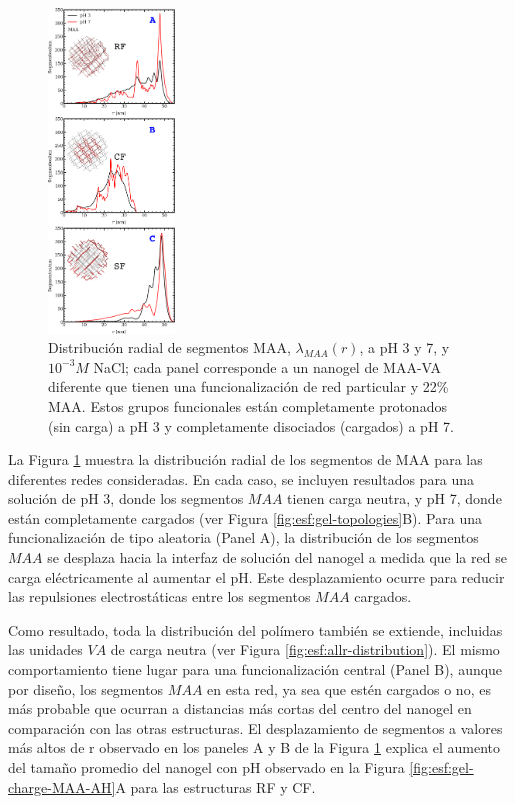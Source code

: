 \begin{figure}[!htb]
     \centering
     \includegraphics[width=0.30\textwidth]{Figures/graphs-gel2/dist-MAA.pdf}
     \caption{Distribuci\'on radial de segmentos MAA, $\lambda_{MAA}(r)$, a pH 3 y 7, y $10^{-3}M$ NaCl; cada panel corresponde a un nanogel de  MAA-VA diferente que tienen una funcionalizaci\'on de red particular y 22\% MAA.
     	Estos grupos funcionales est\'an completamente protonados (sin carga) a pH 3 y completamente disociados (cargados) a pH 7.}
     \label{fig:esf:MAA-vs-r-distribution}
 \end{figure}

La Figura \ref{fig:esf:MAA-vs-r-distribution} muestra la distribuci\'on radial de los segmentos de MAA para las diferentes redes consideradas. En cada caso, se incluyen resultados para una soluci\'on de pH 3, donde los segmentos $MAA$ tienen carga neutra, y pH 7, donde est\'an completamente cargados (ver Figura \ref{fig:esf:gel-topologies}B). Para una funcionalizaci\'on de tipo aleatoria (Panel A), la distribuci\'on de los segmentos $MAA$ se desplaza hacia la interfaz de soluci\'on del nanogel a medida que la red se carga el\'ectricamente al aumentar el pH. Este desplazamiento ocurre para reducir las repulsiones electrost\'aticas entre los segmentos $MAA$ cargados.

Como resultado, toda la distribuci\'on del pol\'imero tambi\'en se extiende, incluidas las unidades $VA$ de carga neutra (ver Figura \ref{fig:esf:allr-distribution}). El mismo comportamiento tiene lugar para una funcionalizaci\'on central (Panel B), aunque por dise\~no, los segmentos $MAA$ en esta red, ya sea que est\'en cargados o no, es m\'as probable que ocurran a distancias m\'as cortas del centro del nanogel en comparaci\'on con las otras estructuras. El desplazamiento de segmentos a valores m\'as altos de r observado en los paneles A y B de la Figura \ref{fig:esf:MAA-vs-r-distribution} explica el aumento del tama\~no promedio del nanogel con pH observado en la Figura \ref{fig:esf:gel-charge-MAA-AH}A para las estructuras RF y CF.

